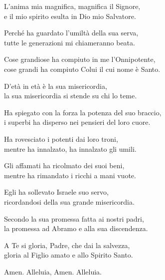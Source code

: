
L'anima mia magnifica, magnifica il Signore,\\
e il mio spirito esulta in Dio mio Salvatore.

\spazio

Perché ha guardato l'umiltà della sua serva,\\
tutte le generazioni mi chiameranno beata.

\spazio

Cose grandiose ha compiuto in me l'Onnipotente,\\
cose grandi ha compiuto Colui il cui nome è Santo.

\spazio

D'età in età è la sua misericordia,\\
la sua misericordia si stende su chi lo teme.

\spazio

Ha spiegato con la forza la potenza del suo braccio,\\
i superbi ha disperso nei pensieri del loro cuore.

\spazio

Ha rovesciato i potenti dai loro troni,\\
mentre ha innalzato, ha innalzato gli umili.

\spazio

Gli affamati ha ricolmato dei suoi beni,\\
mentre ha rimandato i ricchi a mani vuote.

\spazio

Egli ha sollevato Israele suo servo,\\
ricordandosi della sua grande misericordia.

\spazio

Secondo la sua promessa fatta ai nostri padri,\\
la promessa ad Abramo e alla sua discendenza.

\spazio

A Te si gloria, Padre, che dai la salvezza,\\
gloria al Figlio amato e allo Spirito Santo.

\spazio

Amen. Alleluia, Amen. Alleluia.

